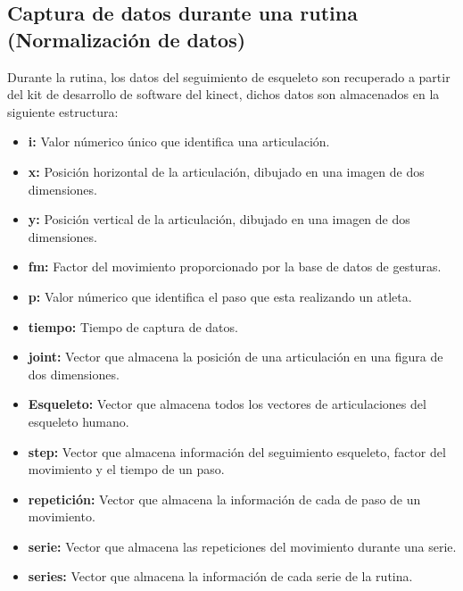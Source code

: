 \subsection{Captura de datos durante una rutina (Normalizaci\'on de datos)}\label{dis:recognitionMove}
Durante la rutina, los datos del seguimiento de esqueleto son recuperado a partir del kit de desarrollo de software del kinect, dichos datos son almacenados en la siguiente estructura:
\begin{itemize}
\item \textbf{i:} Valor n\'umerico \'unico que identifica una articulaci\'on.
\item \textbf{x:} Posici\'on horizontal de la articulaci\'on, dibujado en una imagen de dos dimensiones.
\item \textbf{y:} Posici\'on vertical de la articulaci\'on, dibujado en una imagen de dos dimensiones.
\item \textbf{fm:} Factor del movimiento proporcionado por la base de datos de gesturas.
\item \textbf{p:} Valor n\'umerico que identifica el paso que esta realizando un atleta.
\item \textbf{tiempo:} Tiempo de captura de datos.
\item \textbf{joint:} Vector que almacena la posici\'on de una articulaci\'on en una figura de dos dimensiones.
\item \textbf{Esqueleto:} Vector que almacena todos los vectores de articulaciones del esqueleto humano.
\item \textbf{step:} Vector que almacena informaci\'on del seguimiento esqueleto, factor del movimiento y el tiempo de un paso.
\item \textbf{repetici\'on:} Vector que almacena la informaci\'on de cada de paso de un movimiento.
\item \textbf{serie:} Vector que almacena las repeticiones del movimiento durante una serie.
\item \textbf{series:} Vector que almacena la informaci\'on de cada serie de la rutina.
\end{itemize}
